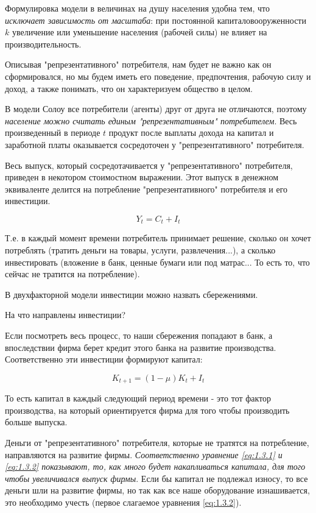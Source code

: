 \documentclass[reqno]{article}
\theoremstyle{definition}
\theoremstyle{definition}
\theoremstyle{definition}
\theoremstyle{definition}
\theoremstyle{definition}
\theoremstyle{definition}
\theoremstyle{definition}
\theoremstyle{definition}
\theoremstyle{definition}
\begin{document}
		Формулировка модели в величинах на душу населения удобна тем, что \emph{исключает зависимость от масштаба}: при постоянной капиталовооруженности $k$ увеличение или уменьшение населения (рабочей силы) не влияет на производительность.
		
		Описывая "репрезентативного" потребителя, нам будет не важно как он сформировался, но мы будем иметь его поведение, предпочтения, рабочую силу и доход, а также понимать, что он характеризуем общество в целом.
		
		В модели Солоу все потребители (агенты) друг от друга не отличаются, поэтому \emph{население можно считать единым "репрезентативным" потребителем}. Весь произведенный в периоде $t$ продукт после выплаты дохода на капитал и заработной платы оказывается сосредоточен у "репрезентативного" потребителя.
		
		Весь выпуск, который сосредотачивается у "репрезентативного" потребителя, приведен в некотором стоимостном выражении. Этот выпуск в денежном эквиваленте делится на потребление "репрезентативного" потребителя и его инвестиции.
		
		\begin{equation}\label{eq:1.3.1}
			Y_t = C_t + I_t
		\end{equation}
		
		Т.е. в каждый момент времени потребитель принимает решение, сколько он хочет потреблять (тратить деньги на товары, услуги, развлечения...), а сколько инвестировать (вложение в банк, ценные бумаги или под матрас... То есть то, что сейчас не тратится на потребление).
		
		В двухфакторной модели инвестиции можно назвать сбережениями.\bigskip
		
		На что направлены инвестиции? 
		
		Если посмотреть весь процесс, то наши сбережения попадают в банк, а впоследствии фирма берет кредит этого банка на развитие производства. Соответственно эти инвестиции формируют капитал:
		
		\begin{equation}\label{eq:1.3.2}
			K_{t+1} = (1 - \mu) K_t + I_t
		\end{equation}
		
		То есть капитал в каждый следующий период времени - это тот фактор производства, на который ориентируется фирма для того чтобы производить больше выпуска.
		
		Деньги от "репрезентативного" потребителя, которые не тратятся на потребление, направляются на развитие фирмы.  \emph{Соответственно уравнение \ref{eq:1.3.1} и \ref{eq:1.3.2} показывают, то, как много будет накапливаться капитала, для того чтобы увеличивался выпуск фирмы}. Если бы капитал не подлежал износу, то все деньги шли на развитие фирмы, но так как все наше оборудование изнашивается, это необходимо учесть (первое слагаемое уравнения \ref{eq:1.3.2}).
		
\end{document}
